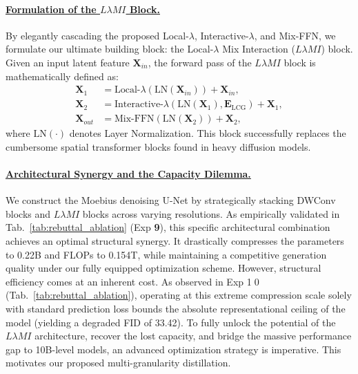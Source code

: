 \documentclass[runningheads]{llncs}
\begin{document}
\vspace{-0.5em}
\paragraph{\underline{Formulation of the $L\lambda MI$ Block.}}
By elegantly cascading the proposed Local-$\lambda$, Interactive-$\lambda$, and Mix-FFN, we formulate our ultimate building block: the Local-$\lambda$ Mix Interaction ($L\lambda MI$) block. Given an input latent feature $\mathbf{X}_{in}$, the forward pass of the $L\lambda MI$ block is mathematically defined as:
\begin{equation}
\begin{aligned}
\mathbf{X}_1 &= \text{Local-}\lambda(\text{LN}(\mathbf{X}_{in})) + \mathbf{X}_{in}, \\
\mathbf{X}_2 &= \text{Interactive-}\lambda(\text{LN}(\mathbf{X}_1), \mathbf{E}_\text{LCG}) + \mathbf{X}_1, \\
\mathbf{X}_{out} &= \text{Mix-FFN}(\text{LN}(\mathbf{X}_2)) + \mathbf{X}_2,
\end{aligned}
\end{equation}
where $\text{LN}(\cdot)$ denotes Layer Normalization. This block successfully replaces the cumbersome spatial transformer blocks found in heavy diffusion models. 

\vspace{-0.5em}
\paragraph{\underline{Architectural Synergy and the Capacity Dilemma.}}\label{para:Architectural_Synergy_and_Capacity_Dilemma}
We construct the Moebius denoising U-Net by strategically stacking DWConv blocks and $L\lambda MI$ blocks across varying resolutions. As empirically validated in Tab.~\ref{tab:rebuttal_ablation} (Exp \textcircled{\small \textbf{9}}), this specific architectural combination achieves an optimal structural synergy. It drastically compresses the parameters to 0.22B and FLOPs to 0.154T, while maintaining a competitive generation quality under our fully equipped optimization scheme. 
\indent However, structural efficiency comes at an inherent cost. As observed in Exp \textcircled{\scriptsize 10} (Tab.~\ref{tab:rebuttal_ablation}), operating at this extreme compression scale solely with standard prediction loss bounds the absolute representational ceiling of the model (yielding a degraded FID of 33.42). To fully unlock the potential of the $L\lambda MI$ architecture, recover the lost capacity, and bridge the massive performance gap to 10B-level models, an advanced optimization strategy is imperative. This motivates our proposed multi-granularity distillation.
\end{document}
